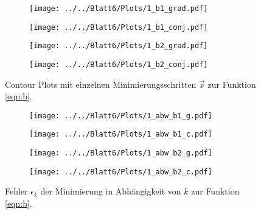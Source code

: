 \begin{figure}[H]
\begin{subfigure}[c]{0.5\textwidth}
\texttt{[image: ../../Blatt6/Plots/1\_b1\_grad.pdf]}
\label{fig:contour2a1}
\end{subfigure}
\begin{subfigure}[c]{0.5\textwidth}
\texttt{[image: ../../Blatt6/Plots/1\_b1\_conj.pdf]}
\label{fig:contour2b1}
\end{subfigure}
\begin{subfigure}[c]{0.5\textwidth}
\texttt{[image: ../../Blatt6/Plots/1\_b2\_grad.pdf]}
\label{fig:contour2a2}
\end{subfigure}
\begin{subfigure}[c]{0.5\textwidth}
\texttt{[image: ../../Blatt6/Plots/1\_b2\_conj.pdf]}
\label{fig:contour2b2}
\end{subfigure}
\caption{Contour Plots mit einzelnen Minimierungsschritten $\vec{x}$ zur Funktion \eqref{eqn:b}.}
\label{fig:contour2}
\end{figure}

\begin{figure}[H]
\begin{subfigure}[c]{0.5\textwidth}
\texttt{[image: ../../Blatt6/Plots/1\_abw\_b1\_g.pdf]}
\label{fig:abw_b1g}
\end{subfigure}
\begin{subfigure}[c]{0.5\textwidth}
\texttt{[image: ../../Blatt6/Plots/1\_abw\_b1\_c.pdf]}
\label{fig:abw_b1c}
\end{subfigure}
\begin{subfigure}[c]{0.5\textwidth}
\texttt{[image: ../../Blatt6/Plots/1\_abw\_b2\_g.pdf]}
\label{fig:abw_b1g}
\end{subfigure}
\begin{subfigure}[c]{0.5\textwidth}
\texttt{[image: ../../Blatt6/Plots/1\_abw\_b2\_c.pdf]}
\label{fig:abw_b1c}
\end{subfigure}
\caption{Fehler $\epsilon_k$ der Minimierung in Abhängigkeit von $k$ zur Funktion \eqref{eqn:b}.}
\label{fig:plot_abw_b}
\end{figure}

